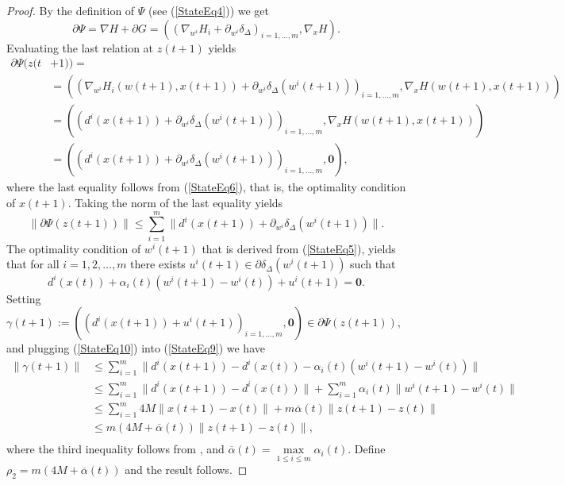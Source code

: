\documentclass[11pt]{article}
\numberwithin{equation}{section}
\begin{document}
\begin{proof}
By the definition of $\Psi$ (see (\ref{StateEq4})) we get
\begin{equation*}
	\partial \Psi = \nabla H + \partial G  
= \left( \left( \nabla_{w^i} H_i + \partial_{w^i} \delta_{\Delta} \right)_{i=1, \ldots ,m} , \nabla_x H \right) .
\end{equation*}
Evaluating the last relation at $z(t+1)$ yields
\begin{equation*}
\begin{aligned}
	\partial \Psi(z(t & + 1)) = \\
	& = \left( \left( \nabla_{w^i} H_i(w(t+1),x(t+1)) + \partial_{w^i} \delta_{\Delta}(w^i(t+1)) \right)_{i=1, \ldots ,m} , \nabla_x H(w(t+1),x(t+1)) \right) \\
	& = \left( \left( d^i(x(t+1)) + \partial_{w^i} \delta_{\Delta}(w^i(t+1)) \right)_{i=1, \ldots ,m} , \nabla_x H(w(t+1),x(t+1)) \right) \\
	& = \left( \left( d^i(x(t+1)) + \partial_{w^i} \delta_{\Delta}(w^i(t+1)) \right)_{i=1, \ldots ,m} , \mathbf{0} \right) ,
\end{aligned}
\end{equation*}
where the last equality follows from (\ref{StateEq6}), that is, the optimality condition of $x(t+1)$. Taking the norm of the last equality yields
\begin{equation}
	\| \partial \Psi(z(t+1))\| 
	\leq \sum\limits_{i=1}^{m} \| d^i(x(t+1)) + \partial_{w^i} \delta_{\Delta}(w^i(t+1)) \|. \label{StateEq9}
\end{equation}
The optimality condition of $w^i(t+1)$ that is derived from (\ref{StateEq5}), yields that for all $i=1, 2, \ldots ,m$ there exists $u^i(t+1) \in \partial \delta_{\Delta}(w^i(t+1))$ such that
\begin{equation}
	d^i(x(t)) + \alpha_i(t) \left( w^i(t+1) - w^i(t) \right) + u^i(t+1) = \mathbf{0} . \label{StateEq10}
\end{equation}
Setting $\gamma(t+1) := \left( \left( d^i(x(t+1)) + u^i(t+1) \right)_{i=1, \ldots ,m}, \mathbf{0} \right) \in \partial \Psi(z(t+1))$, and plugging (\ref{StateEq10}) into (\ref{StateEq9}) we have
\begin{equation*}
\begin{aligned}
	\| \gamma(t+1) \|
	& \leq \sum\limits_{i=1}^{m} \| d^i(x(t+1)) - d^i(x(t)) - \alpha_i(t) \left( w^i(t+1) - w^i(t) \right) \| \\
	& \leq \sum\limits_{i=1}^{m} \| d^i(x(t+1)) - d^i(x(t)) \| + \sum\limits_{i=1}^{m} \alpha_i(t) \| w^i(t+1) - w^i(t) \| \\
	& \leq \sum\limits_{i=1}^{m} 4M \| x(t+1) - x(t) \| + m \overline{\alpha}(t) \|z(t+1) - z(t)\| \\
	& \leq m \left( 4M + \overline{\alpha}(t) \right) \|z(t+1) - z(t)\| , \\
\end{aligned}
\end{equation*}
where the third inequality follows from , and $\overline{\alpha}(t) = \max\limits_{1 \leq i \leq m} \alpha_i(t)$. Define \\$\rho_2 = m \left( 4M + \overline{\alpha}(t) \right)$ and the result follows.
\end{proof}
\end{document}
